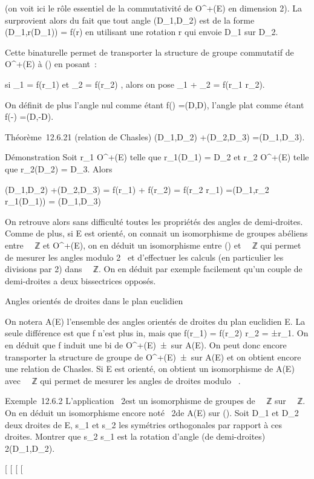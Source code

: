 \documentclass[]{article}
\begin{document}
(on voit ici le rôle essentiel de la commutativité de O^+(E)
en dimension 2). La sur provient alors du fait que tout angle
\widehat(D\_1,D\_2) est de la forme
\widehat(D\_1,r(D\_1)) = f(r) en
utilisant une rotation r qui envoie D\_1 sur D\_2.

Cette bi\jmathection naturelle permet de transporter la structure de groupe
commutatif de O^+(E) à \tildeA() en
posant~:

si \theta\_1 = f(r\_1) et \theta\_2 = f(r\_2) ,
alors on pose \theta\_1 + \theta\_2 = f(r\_1 \cdot
r\_2).

On définit de plus l'angle nul comme étant
f(\mathrmId) =\widehat (D,D),
l'angle plat comme étant f(-\mathrmId)
=\widehat (D,-D).

Théorème~12.6.21 (relation de Chasles)
\widehat(D\_1,D\_2)
+\widehat (D\_2,D\_3)
=\widehat (D\_1,D\_3).

Démonstration Soit r\_1 \in O^+(E) telle que
r\_1(D\_1) = D\_2 et r\_2 \in
O^+(E) telle que r\_2(D\_2) = D\_3.
Alors

\widehat(D\_1,D\_2)
+\widehat (D\_2,D\_3) =
f(r\_1) + f(r\_2) = f(r\_2 \cdot r\_1)
=\widehat (D\_1,r\_2 \cdot
r\_1(D\_1)) =\widehat
(D\_1,D\_3)

On retrouve alors sans difficulté toutes les propriétés des angles de
demi-droites. Comme de plus, si E est orienté, on connait un
isomorphisme de groupes abéliens entre ~\pi~ℤ et O^+(E), on en
déduit un isomorphisme entre \tildeA() et ~\pi~ℤ qui
permet de mesurer les angles modulo 2\pi~ et d'effectuer les calculs (en
particulier les divisions par 2) dans ~\pi~ℤ. On en déduit par exemple
facilement qu'un couple de demi-droites a deux bissectrices opposés.

Angles orientés de droites dans le plan euclidien

On notera A(E) l'ensemble des angles orientés de droites du plan
euclidien E. La seule différence est que f n'est plus in\jmathective, mais
que f(r\_1) = f(r\_2) \Leftrightarrow
r\_2 = ±r\_1. On en déduit que f induit une bi\jmathection
\tildef de O^+(E)\diagup\
±\mathrmId\ sur A(E). On peut donc
encore transporter la structure de groupe de
O^+(E)\diagup\
±\mathrmId\ sur A(E) et on obtient
encore une relation de Chasles. Si E est orienté, on obtient un
isomorphisme de A(E) avec ~\diagup\pi~ℤ qui permet de mesurer les angles de
droites modulo \pi~.

Exemple~12.6.2 L'application \theta\mapsto~2\theta est un
isomorphisme de groupes de ~\diagup\pi~ℤ sur ~\pi~ℤ. On en déduit un isomorphisme
encore noté \theta\mapsto~2\theta de A(E) sur
\tildeA(\mathcal{E}). Soit D\_1 et D\_2 deux
droites de E, s\_1 et s\_2 les symétries orthogonales
par rapport à ces droites. Montrer que s\_2 \cdot s\_1 est
la rotation d'angle (de demi-droites)
2\widehat(D\_1,D\_2).

{[}
{[}
{[}
{[}
\end{document}
